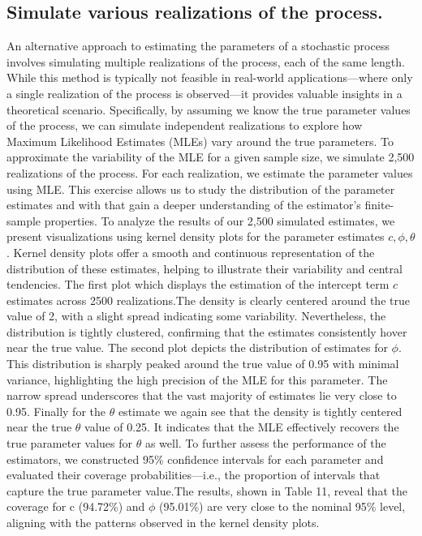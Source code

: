 \documentclass[12pt]{article}
\begin{document}
\subsection{Simulate various realizations of the process.}
An alternative approach to estimating the parameters of a stochastic process involves simulating multiple realizations of the process, each of the same length. 
While this method is typically not feasible in real-world applications—where only a single realization of the process is observed—it provides valuable insights in a theoretical scenario. Specifically, by assuming we know the true parameter values of the process, we can simulate independent realizations to explore how Maximum Likelihood Estimates (MLEs) vary around the true parameters.
To approximate the variability of the MLE for a given sample size, we simulate 2,500 realizations of the process. For each realization, we estimate the parameter values using MLE. This exercise allows us to study the distribution of the parameter estimates and with that gain a deeper understanding of the estimator's finite-sample properties.
To analyze the results of our 2,500 simulated estimates, we present visualizations using kernel density plots for the parameter estimates  $c, \phi,\theta$.
Kernel density plots offer a smooth and continuous representation of the distribution of these estimates, helping to illustrate their variability and central tendencies.
The first plot which displays the estimation of the intercept term $c$ estimates across 2500 realizations.The density is clearly centered around the true value of 2, with a slight spread indicating some variability. Nevertheless, the distribution is tightly clustered, confirming that the estimates consistently hover near the true value.
The second plot depicts the distribution of estimates for $\phi$. This distribution is sharply peaked around the true value of 0.95 with minimal variance, highlighting the high precision of the MLE for this parameter. The narrow spread underscores that the vast majority of estimates lie very close to 0.95.
Finally for the $\theta$ estimate we again see that the density is tightly centered near the true $\theta$ value of 0.25. It indicates that the MLE effectively recovers the true parameter values for $\theta$ as well.
To further assess the performance of the estimators, we constructed 95\% confidence intervals for each parameter and evaluated their coverage probabilities—i.e., the proportion of intervals that capture the true parameter value.The results, shown in Table 11, reveal that the coverage for 
c (94.72\%) and $\phi$ (95.01\%) are very close to the nominal 95\% level, aligning with the patterns observed in the kernel density plots. 
\end{document}

